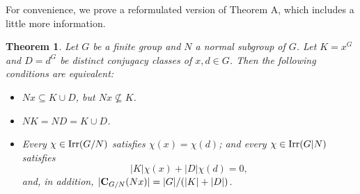 \documentclass[12pt,leqno,a4paper]{amsart}
\newtheorem{theorem}{Theorem}[section]
\numberwithin{equation}{section}
\begin{document}
 \medskip
  For convenience, we prove  a reformulated version of Theorem A, which includes a little more information.

 \begin{theorem}\label{2} Let $G$ be a finite group and $N$ a normal subgroup of $G$. Let $K =x^G$ and $D=d^G$ be distinct conjugacy classes of $x,d \in G$. Then the following conditions are equivalent:

 \begin{itemize}
 \item[(a)] $Nx \subseteq K \cup D$, but $Nx \not\subseteq K$.
 \item[(b)] $NK=ND=K\cup D$.
 \item[(c)] Every  $\chi \in {\rm Irr}(G/N)$ satisfies $\chi(x)=\chi(d)$; and  every $\chi\in {\rm Irr}(G|N)$ satisfies
 $$|K|\chi(x) +|D|\chi(d)=0,$$
and, in addition, $|{\bf C}_{G/N}(Nx)|= |G|/(|K|+|D|)$.
 \end{itemize}



\end{theorem}
\end{document}
